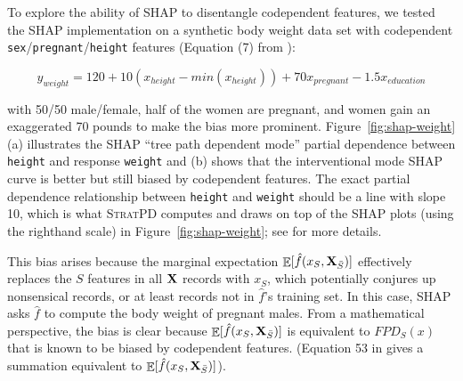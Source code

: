 \documentclass[11pt]{article}
\newcommand{\figref}[1]{Figure~\ref{#1}}
\DeclareMathOperator{\Ex}{\mathbb{E}}
\newcommand{\spd}{\fontfamily{cmr}\textsc{\small StratPD}}
\begin{document}
To explore the ability of SHAP to disentangle codependent features, we tested the SHAP implementation on a synthetic body weight data set with codependent {\tt\small sex}/{\tt\small pregnant}/{\tt\small height} features (Equation (7) from \citealt{stratpd}):

\begin{equation}\label{eq:weight}
y_{weight}  = 120 + 10(x_{height} - min(x_{height})) + 70x_{pregnant} - 1.5x_{education}
\end{equation}

\noindent with 50/50 male/female, half of the women are pregnant, and women gain an exaggerated 70 pounds to make the bias more prominent. \figref{fig:shap-weight}(a) illustrates the SHAP ``tree path dependent mode'' partial dependence between {\tt height} and response {\tt weight} and (b) shows that the interventional mode SHAP curve is better but still biased by codependent features.  The exact partial dependence relationship between {\tt height} and {\tt weight} should be a line with slope 10, which is what \spd{} computes and draws on top of the SHAP plots (using the righthand scale) in \figref{fig:shap-weight}; see \citet{stratpd} for more details.

This bias arises because the marginal expectation $\Ex[\hat{f}(x_{S},{\bf X}_{\bar{S}})]$ effectively replaces the $S$ features in all $\bf X$ records with $x_S$, which potentially conjures up nonsensical records, or at least records not in $\hat{f}$'s training set.  In this case, SHAP asks $\hat{f}$ to compute the body weight of pregnant males. From a mathematical perspective, the bias is clear because $\Ex[\hat{f}(x_{S},{\bf X}_{\bar{S}})]$ is equivalent to $FPD_S(x)$ that is known to be biased by codependent features. (Equation 53 in \citealt{PDP} gives a summation equivalent to $\Ex[\hat{f}(x_{S},{\bf X}_{\bar{S}})]$).  
\end{document}
